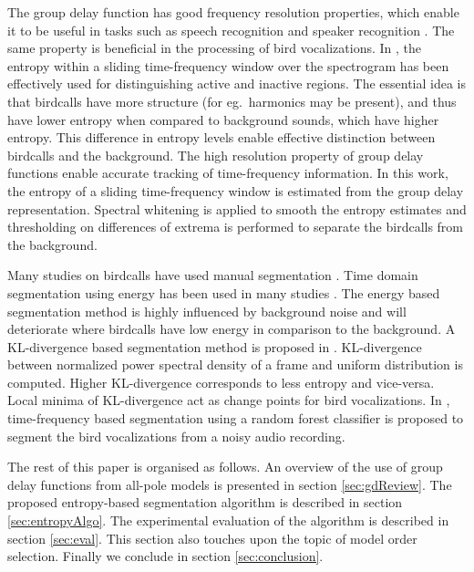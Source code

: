 \documentclass[a4paper]{article}
\begin{document}
The group delay function has good frequency resolution properties, which enable
it to be useful in tasks such as speech recognition and speaker recognition
\cite{hema} \cite{padman} \cite{modgdf}. The same property is beneficial in the
processing of bird vocalizations. In \cite{wang2013}, the entropy within a
sliding time-frequency window over the spectrogram has been effectively used for
distinguishing active and inactive regions. The essential idea is that birdcalls
have more structure (for eg.~harmonics may be present), and thus have lower
entropy when compared to background sounds, which have higher entropy. This
difference in entropy levels enable effective distinction between birdcalls and
the background.
The high resolution property of group delay functions enable accurate tracking
of time-frequency information. In this work, the entropy of a sliding
time-frequency window is estimated from the group delay representation. Spectral
whitening is applied to smooth the entropy estimates and thresholding on
differences of extrema is performed to separate the birdcalls from the
background.

Many studies on birdcalls have used manual segmentation \cite{Trifa} \cite{Lee}
\cite{Kaewtip}. Time domain segmentation using energy has been used in many
studies \cite{Harma} \cite{Somervuo} \cite{Fagerlund} . The energy  based
segmentation method is highly influenced by background noise and will
deteriorate  where birdcalls have low energy in comparison to the background. A
KL-divergence based segmentation method is proposed in \cite{Lakshmi}.
KL-divergence between normalized power spectral density of a frame and uniform
distribution is computed. Higher KL-divergence corresponds to less entropy and
vice-versa. Local minima of KL-divergence act as change points for bird
vocalizations. In \cite{Neal}, time-frequency based segmentation using a random
forest classifier is proposed to  segment the bird vocalizations from a noisy
audio recording.

The rest of this paper is organised as follows. An overview of the use of group
delay functions from all-pole models is presented in section \ref{sec:gdReview}.
The proposed entropy-based segmentation algorithm is described in section
\ref{sec:entropyAlgo}. The experimental evaluation of the algorithm is described
in section \ref{sec:eval}. This section also touches upon the topic of model
order selection. Finally we conclude in section \ref{sec:conclusion}.
\end{document}
